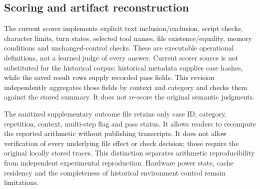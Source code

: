 \subsection{Scoring and artifact reconstruction}
The current scorer implements explicit text inclusion/exclusion, script checks, character limits, turn states, selected tool names, file existence/equality, memory conditions and unchanged-control checks. These are executable operational definitions, not a learned judge of every answer. Current scorer source is not substituted for the historical corpus: historical metadata supplies case hashes, while the saved result rows supply recorded pass fields. This revision independently aggregates those fields by context and category and checks them against the stored summary. It does not re-score the original semantic judgments.

The sanitized supplementary outcome file retains only case ID, category, repetition, context, multi-step flag and pass status. It allows readers to recompute the reported arithmetic without publishing transcripts. It does not allow verification of every underlying file effect or check decision; those require the original locally stored traces. This distinction separates arithmetic reproducibility from independent experimental reproduction. Hardware power state, cache residency and the completeness of historical environment control remain limitations.

